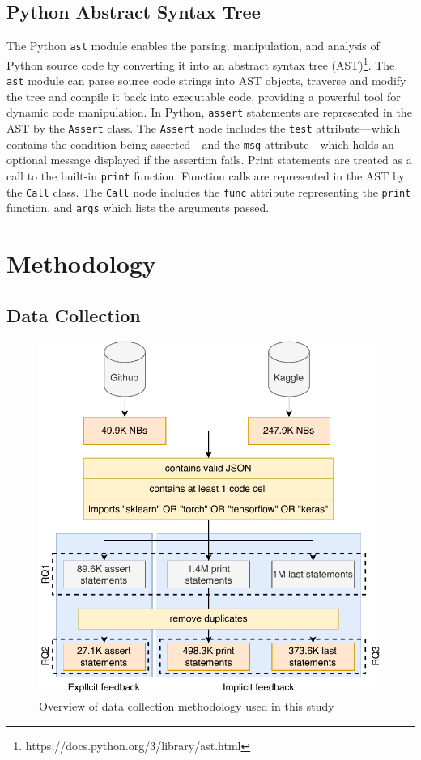 \documentclass[smallextended]{svjour3}       %
\begin{document}
\subsection{Python Abstract Syntax Tree}

The Python \lstinline{ast} module enables the parsing, manipulation, and analysis of Python source code by converting it into an abstract syntax tree (AST)\footnote{https://docs.python.org/3/library/ast.html}. The \lstinline{ast} module can parse source code strings into AST objects, traverse and modify the tree and compile it back into executable code, providing a powerful tool for dynamic code manipulation. In Python, \lstinline{assert} statements are represented in the AST by the \lstinline{Assert} class. The \lstinline{Assert} node includes the \lstinline{test} attribute---which contains the condition being asserted---and the \lstinline{msg} attribute---which holds an optional message displayed if the assertion fails. Print statements are treated as a call to the built-in \lstinline{print} function. Function calls are represented in the AST by the \lstinline{Call} class. The \lstinline{Call} node includes the \lstinline{func} attribute representing the \lstinline{print} function, and \lstinline{args} which lists the arguments passed.

\section{Methodology}

\subsection{Data Collection}\label{sec:data-collect}

\begin{figure}
	\centering
	\includegraphics[width=0.75\linewidth]{data-collection.pdf}
	\caption{Overview of data collection methodology used in this study}
	\label{fig:data-collection}
\end{figure}
\end{document}
